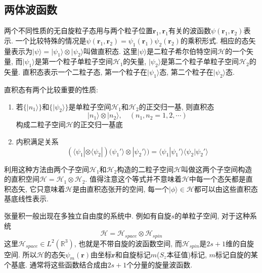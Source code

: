 \documentclass[a4paper,11pt]{book}
\begin{document}
\subsection{两体波函数}
两个不同性质的无自旋粒子态用与两个粒子位置$\mathbf{r}_1,\mathbf{r}_1$有关的波函数$\psi(\mathbf{r}_1,\mathbf{r}_2)$表示. 一个比较特殊的情况是$\psi(\mathbf{r}_1,\mathbf{r}_2)=\psi_1(\mathbf{r}_1)\psi_2(\mathbf{r}_2)$的乘积形式. 相应的态矢量表示为$|\psi\rangle=|\psi_1\rangle\otimes|\psi_2\rangle$叫做直积态. 这里$|\psi\rangle$是二粒子希尔伯特空间$\mathcal{H}$的一个矢量, 而$|\psi_1\rangle$是第一个粒子单粒子空间$\mathcal{H}_1$的矢量, $|\psi_2\rangle$是第二个粒子单粒子空间$\mathcal{H}_2$的矢量. 直积态表示一个二粒子态, 第一个粒子在$|\psi_1\rangle$态, 第二个粒子在$|\psi_2\rangle$态.

直积态有两个比较重要的性质:
\begin{enumerate}
  \item 若$\{|n_1\rangle\}$和$\{|\psi_2\rangle\}$是单粒子空间$\mathcal{H}_1$和$\mathcal{H}_2$的正交归一基, 则直积态
      \begin{equation*}
        |n_1\rangle\otimes|n_2\rangle,\quad (n_1,n_2=1,2,\cdots)
      \end{equation*}
      构成二粒子空间$\mathcal{H}$的正交归一基底
  \item 内积满足关系
  \begin{equation*}
    (\langle\psi_1|\otimes\langle\psi_2|)(\psi_1'\rangle\otimes|\psi_2'\rangle)=\langle\psi_1|\psi_1'\rangle\langle\psi_2|\psi_2'\rangle
  \end{equation*}
\end{enumerate}
利用这种方法由两个子空间$\mathcal{H}_1$和$\mathcal{H}_2$构造的二粒子空间$\mathcal{H}$叫做这两个子空间构造的直积空间$\mathcal{H}=\mathcal{H}_1\otimes\mathcal{H}_2$. 值得注意这个等式并不意味着$\mathcal{H}$中每一个态矢都是直积态矢, 它只意味着$\mathcal{H}$是由直积态张开的空间, 每一个$|\phi\rangle\in\mathcal{H}$都可以由这些直积态基底线性表示.

张量积一般出现在多独立自由度的系统中. 例如有自旋$s$的单粒子空间, 对于这种系统
\begin{equation*}
  \mathcal{H}=\mathcal{H}_{space}\otimes\mathcal{H}_{spin}
\end{equation*}
这里$\mathcal{H}_{space}\in L^2(\mathbb{R}^3)$, 也就是不带自旋的波函数空间, 而$\mathcal{H}_{spin}$是$2s+1$维的自旋空间. 所以$\mathcal{H}$的态矢$\psi_{m}(\mathbf{r})$由坐标$\mathbf{r}$和自旋标记$m$($S_z$本征值)标记, $m$标记自旋的某个基底. 通常将这些函数结合成由$2s+1$个分量的旋量波函数.
\end{document}
